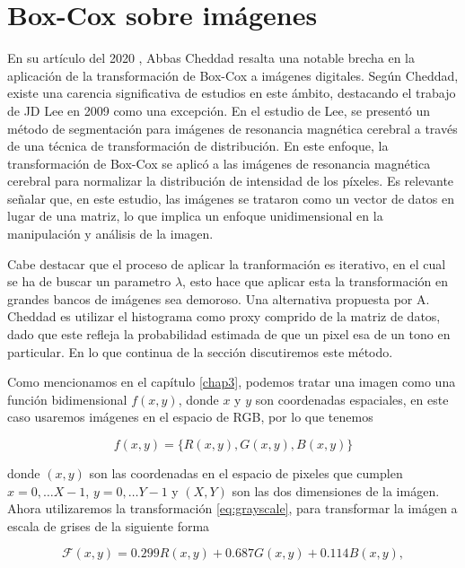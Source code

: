     \section{Box-Cox sobre im\'agenes} 

    En su art\'iculo del 2020 \cite{boxcoximg}, Abbas Cheddad resalta una notable brecha en la aplicaci\'on de la transformaci\'on de Box-Cox a im\'agenes digitales. Seg\'un Cheddad, existe una carencia significativa de estudios en este \'ambito, destacando el trabajo de JD Lee en 2009 como una excepci\'on\cite{lee2009mr}. En el estudio de Lee, se present\'o un m\'etodo de segmentaci\'on para im\'agenes de resonancia magn\'etica cerebral a trav\'es de una t\'ecnica de transformaci\'on de distribuci\'on. En este enfoque, la transformaci\'on de Box-Cox se aplic\'o a las im\'agenes de resonancia magn\'etica cerebral para normalizar la distribuci\'on de intensidad de los p\'ixeles. Es relevante se\~nalar que, en este estudio, las im\'agenes se trataron como un vector de datos en lugar de una matriz, lo que implica un enfoque unidimensional en la manipulaci\'on y an\'alisis de la imagen.

    Cabe destacar que el proceso de aplicar la tranformaci\'on es iterativo, en el cual se ha de buscar un parametro $\lambda$, esto hace que aplicar esta la transformaci\'on en grandes bancos de im\'agenes sea demoroso. Una alternativa propuesta por A. Cheddad \cite{boxcoximg} es utilizar el histograma como proxy comprido de la matriz de datos, dado que este refleja la probabilidad estimada de que un pixel esa de un tono en particular. En lo que continua de la secci\'on discutiremos este m\'etodo.

    Como mencionamos en el cap\'itulo \ref{chap3}, podemos tratar una imagen como una funci\'on bidimensional $f(x,y)$, donde $x$ y $y$ son coordenadas espaciales, en este caso usaremos im\'agenes en el espacio de RGB, por lo que tenemos 
    
    $$
    f(x, y)=\{R(x, y), G(x, y), B(x, y)\}
    $$

    donde $(x, y)$ son las coordenadas en el espacio de pixeles que cumplen $x=0, \ldots X-1$, $y=0, \ldots Y-1$ y $(X, Y)$ son las dos dimensiones de la im\'agen. Ahora utilizaremos la transformaci\'on \ref{eq:grayscale}, para transformar la im\'agen a escala de grises de la siguiente forma

    \begin{equation*}
        \mathcal{F}(x, y)=0.299 R(x, y)+0.687 G(x, y)+0.114 B(x, y), 
    \end{equation*}

